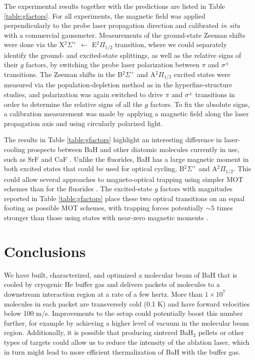 \documentclass[amsmath,amssymb,aps,twocolumn,longbibliography,notitlepage]{revtex4-1}
\begin{document}
The experimental results together with the predictions are listed in Table \ref{table:gfactors}.  For all experiments, the magnetic field was applied perpendicularly to the probe laser propagation direction and calibrated \textit{in situ} with a commercial gaussmeter.  Measurements of the ground-state Zeeman shifts were done via the X$^2\Sigma^+$ $\leftarrow$ E$^2\Pi_{1/2}$ transition, where we could separately identify the ground- and excited-state splittings, as well as the relative signs of their $g$ factors, by switching the probe laser polarization between $\pi$ and $\sigma^{\pm}$ transitions.  The Zeeman shifts in the B$^2\Sigma^+$ and A$^2\Pi_{1/2}$ excited states were measured via the population-depletion method as in the hyperfine-structure studies, and polarization was again switched to drive $\pi$ and $\sigma^{\pm}$ transitions in order to determine the relative signs of all the $g$ factors.  To fix the absolute signs, a calibration measurement was made by applying a magnetic field along the laser propagation axis and using circularly polarized light.

The results in Table \ref{table:gfactors} highlight an interesting difference in laser-cooling prospects between BaH and other diatomic molecules currently in use, such as SrF \cite{DeMilleSteineckerCPC16_ImprovedSrF_RF_MOT} and CaF \cite{TarbuttTruppeArXiv17_CaFBelowDopplerLimit,DoyleAndereggArXiv17_CaF_RF_MOT}.  Unlike the fluorides, BaH has a large magnetic moment in both excited states that could be used for optical cycling, B$^2\Sigma^+$ and A$^2\Pi_{1/2}$.  This could allow several approaches to magneto-optical trapping using simpler MOT schemes than for the fluorides \cite{TarbuttNJP15_ComplexLevelMOT}.
The excited-state $g$ factors with magnitudes reported in Table \ref{table:gfactors} place these two optical transitions on an equal footing as possible MOT schemes, with trapping forces potentially $\sim5$ times stronger than those using states with near-zero magnetic moments \cite{TarbuttNJP15_ComplexLevelMOT,TarbuttDevlinNJP16_3DMolecularMOTForces}.

\section{Conclusions}
\label{sec:Outlook}

We have built, characterized, and optimized a molecular beam of BaH that is cooled by cryogenic He buffer gas and delivers packets of molecules to a downstream interaction region at a rate of a few hertz.  More than $1\times10^7$ molecules in each packet are transversely cold (0.1 K) and have forward velocities below 100 m/s.  Improvements to the setup could potentially boost this number further, for example by achieving a higher level of vacuum in the molecular beam region.  Additionally, it is possible that producing sintered BaH$_2$ pellets or other types of targets could allow us to reduce the intensity of the ablation laser, which in turn might lead to more efficient thermalization of BaH with the buffer gas.
\end{document}
